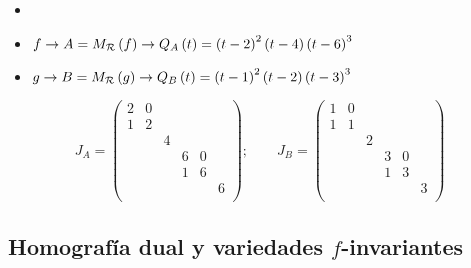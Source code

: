 \begin{example}
	\begin{itemize}
		\item[]
		\item $f \to A= M_{\mathcal{R}} \left( f \right) \to Q_A\left( t \right) = \left( t-2 \right)^2\left( t-4 \right)\left( t-6 \right)^3$
		\item $g \to B= M_{\mathcal{R}} \left( g \right) \to Q_B\left( t \right) = \left( t-1 \right)^2\left( t-2 \right)\left( t-3 \right)^3$
	\end{itemize}
	\[
		J_A = 
		\begin{pmatrix}
			2 & 0 &   &   &   &   \\
			1 & 2 &   &   &   &   \\
			  &   & 4 &   &   &   \\
			  &   &   & 6 & 0 &   \\
			  &   &   & 1 & 6 &   \\
			  &   &   &   &   & 6 \\
		\end{pmatrix}; \qquad
		J_B =
		\begin{pmatrix}
			1 & 0 &   &   &   &   \\
			1 & 1 &   &   &   &   \\
			  &   & 2 &   &   &   \\
			  &   &   & 3 & 0 &   \\
			  &   &   & 1 & 3 &   \\
			  &   &   &   &   & 3 \\
		\end{pmatrix}
	\]
\end{example}

\subsection{Homografía dual y variedades $f$-invariantes}

